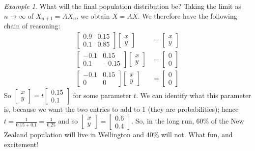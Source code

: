 \documentclass[10pt, a4paper]{amsart}
\theoremstyle{definition}
\theoremstyle{remark}
\newtheorem{ex}{Example}
\begin{document}
\begin{ex}
  What will the final population distribution be? Taking the limit as $ n \to \infty $ of $ X_{n+1} = AX_n $,
  we obtain $ X = AX $.
  We therefore have the following chain of reasoning:
  \begin{align*}
    \begin{bmatrix} 0.9 & 0.15 \\ 0.1 & 0.85 \end{bmatrix} \begin{bmatrix} x \\ y \end{bmatrix} &= \begin{bmatrix} x \\ y \end{bmatrix}\\
    \begin{bmatrix} -0.1 & 0.15 \\ 0.1 & -0.15 \end{bmatrix} \begin{bmatrix} x \\ y \end{bmatrix} &= \begin{bmatrix} 0 \\ 0 \end{bmatrix}\\
    \begin{bmatrix} -0.1 & 0.15 \\ 0 & 0 \end{bmatrix} \begin{bmatrix} x \\ y \end{bmatrix} &= \begin{bmatrix} 0 \\ 0 \end{bmatrix}
  \end{align*}
  So $ \begin{bmatrix} x \\ y \end{bmatrix} = t\begin{bmatrix} 0.15 \\ 0.1 \end{bmatrix} $ for some parameter $ t $. We can identify what this parameter is,
  because we want the two entries to add to 1 (they are probabilities); hence $ t = \frac{1}{0.15 + 0.1} = \frac{1}{0.25} $ and so
  $ \begin{bmatrix} x \\ y \end{bmatrix} = \begin{bmatrix} 0.6 \\ 0.4 \end{bmatrix} $. So, in the long run, 60\% of the New Zealand population will
  live in Wellington and 40\% will not. What fun, and excitement!
  \label{ex:Markov}
\end{ex}
\end{document}

